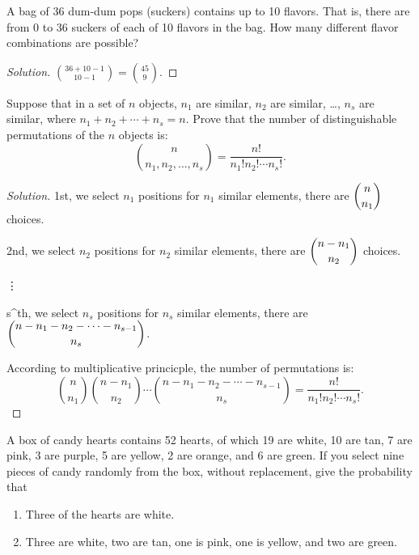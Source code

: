 \documentclass[class=probandstats,crop=false]{standalone}
\begin{document}
\begin{exercise}
    \par A bag of 36 dum-dum pops (suckers) contains up to 10 flavors. That is, there are from 0 to 36 suckers of each of 10 flavors in the bag. How many different flavor combinations are possible?
\end{exercise}

\begin{proof}[Solution]
    \par $\binom{36 + 10 - 1}{10 - 1} = \binom{45}{9}$.
\end{proof}

\begin{exercise}
    \par Suppose that in a set of $n$ objects, $n_{1}$ are similar, $n_{2}$ are similar, \ldots , $n_{s}$ are similar, where $n_{1} + n_{2} + \cdots + n_{s} = n$. Prove that the number of distinguishable permutations of the $n$ objects is:
    \[
        \binom{n}{n_{1},n_{2},\ldots,n_{s}} = \frac{n!}{n_{1}!n_{2}!\cdots n_{s}!}.
    \]
\end{exercise}

\begin{proof}[Solution]
    \par 1st, we select $n_{1}$ positions for $n_{1}$ similar elements, there are $\dbinom{n}{n_{1}}$ choices.
    \par 2nd, we select $n_{2}$ positions for $n_{2}$ similar elements, there are $\dbinom{n-n_{1}}{n_{2}}$ choices.
    \par \vdots
    \par s^{th}, we select $n_{s}$ positions for $n_{s}$ similar elements, there are $\dbinom{n-n_{1}-n_{2}-\cdots-n_{s-1}}{n_{s}}$.
    \par According to multiplicative princicple, the number of permutations is:
    \[
        \binom{n}{n_{1}}\binom{n-n_{1}}{n_{2}}\cdots\binom{n-n_{1}-n_{2}-\cdots-n_{s-1}}{n_{s}} = \frac{n!}{n_{1}!n_{2}!\cdots n_{s}!}.
    \]
\end{proof}

\begin{exercise}
    \par A box of candy hearts contains 52 hearts, of which 19 are white, 10 are tan, 7 are pink, 3 are purple, 5 are yellow, 2 are orange, and 6 are green. If you select nine pieces of candy randomly from the box, without replacement, give the probability that
    \begin{enumerate}[label = \textbf{(\alph*)}]
        \item Three of the hearts are white.
        \item Three are white, two are tan, one is pink, one is yellow, and two are green.
    \end{enumerate}
\end{exercise}
\end{document}
